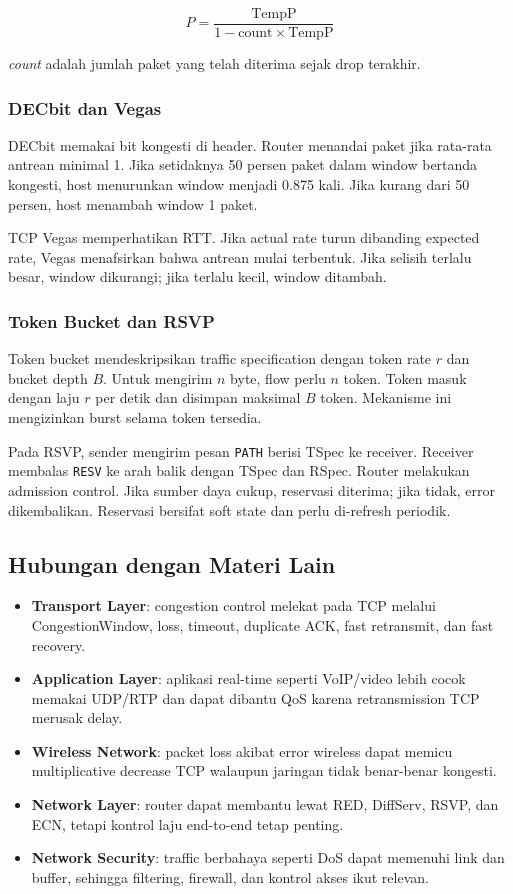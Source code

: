 \[
P=\frac{\text{TempP}}{1-\text{count}\times \text{TempP}}
\]

\textit{count} adalah jumlah paket yang telah diterima sejak drop terakhir.

\subsubsection*{DECbit dan Vegas}

DECbit memakai bit kongesti di header. Router menandai paket jika rata-rata antrean minimal 1. Jika setidaknya 50 persen paket dalam window bertanda kongesti, host menurunkan window menjadi 0.875 kali. Jika kurang dari 50 persen, host menambah window 1 paket.

TCP Vegas memperhatikan RTT. Jika actual rate turun dibanding expected rate, Vegas menafsirkan bahwa antrean mulai terbentuk. Jika selisih terlalu besar, window dikurangi; jika terlalu kecil, window ditambah.

\subsubsection*{Token Bucket dan RSVP}

Token bucket mendeskripsikan traffic specification dengan token rate $r$ dan bucket depth $B$. Untuk mengirim $n$ byte, flow perlu $n$ token. Token masuk dengan laju $r$ per detik dan disimpan maksimal $B$ token. Mekanisme ini mengizinkan burst selama token tersedia.

Pada RSVP, sender mengirim pesan \texttt{PATH} berisi TSpec ke receiver. Receiver membalas \texttt{RESV} ke arah balik dengan TSpec dan RSpec. Router melakukan admission control. Jika sumber daya cukup, reservasi diterima; jika tidak, error dikembalikan. Reservasi bersifat soft state dan perlu di-refresh periodik.

\subsection{Hubungan dengan Materi Lain}

\begin{itemize}
    \item \textbf{Transport Layer}: congestion control melekat pada TCP melalui CongestionWindow, loss, timeout, duplicate ACK, fast retransmit, dan fast recovery.
    \item \textbf{Application Layer}: aplikasi real-time seperti VoIP/video lebih cocok memakai UDP/RTP dan dapat dibantu QoS karena retransmission TCP merusak delay.
    \item \textbf{Wireless Network}: packet loss akibat error wireless dapat memicu multiplicative decrease TCP walaupun jaringan tidak benar-benar kongesti.
    \item \textbf{Network Layer}: router dapat membantu lewat RED, DiffServ, RSVP, dan ECN, tetapi kontrol laju end-to-end tetap penting.
    \item \textbf{Network Security}: traffic berbahaya seperti DoS dapat memenuhi link dan buffer, sehingga filtering, firewall, dan kontrol akses ikut relevan.
\end{itemize}

